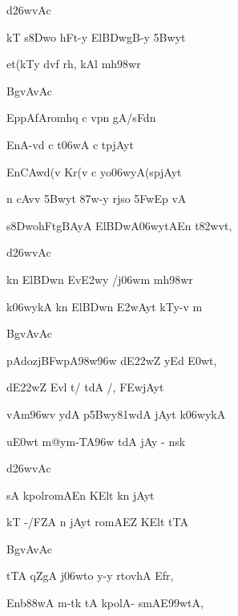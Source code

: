 {\dn d\?\326wvAc{\dandabdn}\dontdisplaylinenum }

{\dn kT\2 s\38Dwo hFt-y El\3BDwgB\0-y \35Bwyt\?{\dandadn} \dontdisplaylinenum}

{\dn et(kTy d\?v\?f rh, kAl\? mh\?\398wr \vegdn\dontdisplaylinenum}

{\dn BgvAvAc{\dandabdn}\dontdisplaylinenum }

{\dn EppAfAromhq{\rdt} c v\?pn\2 gA/sFdn \dontdisplaylinenum}

{\dn EnA-v\?d\2 c t\306wA c t\0pjAyt\? \vegdn\dontdisplaylinenum}

{\dn En\3CAw\?d(v\2 Kr(v\2 c yo\306wyA(spjAyt\?{\dandabdn} \dontdisplaylinenum}

{\dn n cA\0v\2v\4 \35Bwy\?t \387w-y rjso \35FwEp vA{\dandadn}\dontdisplaylinenum  }

{\dn s\38DwohFtgBA\0yA El\3BDwA\306wy\?tAEn t\382wvt, \vegdn\dontdisplaylinenum}

{\dn d\?\326wvAc{\dandabdn}\dontdisplaylinenum }

{\dn k\?n El\3BDw\?n Ev\3E2w\?y\2 /j\306wm mh\?\398wr{\dandadn} \dontdisplaylinenum}

{\dn k\306wykA k\?n El\3BDw\?n \3E2wAyt\? kTy-v m\? \vegdn\dontdisplaylinenum}

{\dn BgvAvAc{\dandabdn}\dontdisplaylinenum }

{\dn pAdozj\3BFwpA\398w\0\396w dE\322wZ\2 yEd \3E0wt,{\dandadn} \dontdisplaylinenum}

{\dn dE\322wZ\2 Evl\2 t/ tdA /, \3FEwjAyt\? \vegdn\dontdisplaylinenum}

{\dn vAm\396w\4v ydA p\35Bwy\?\381wdA jAy\?t k\306wykA{\dandabdn} \dontdisplaylinenum}

{\dn u\3E0wt\2 m@ym-TA\396w tdA jAy\? {\rs -\re} n\2sk \vegdn\dontdisplaylinenum}

{\dn d\?\326wvAc{\dandabdn}\dontdisplaylinenum }

{\dn {}\2sA kpolromAEn KElt\2 k\?n jAyt\?{\dandadn} \dontdisplaylinenum}

{\dn kT\2 -/FZA\2 n jAy\?t romAEZ KElt\2 tTA \vegdn\dontdisplaylinenum}

{\dn BgvAvAc{\dandabdn}\dontdisplaylinenum }

{\dn tTA qZgA j\306wto y-y r\?tovhA Efr,{\dandadn} \dontdisplaylinenum}

{\dn Enb\388wA m-tk\? tA kpolA- smAE\399wtA, \vegdn\dontdisplaylinenum}

